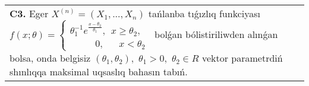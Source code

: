 \documentclass{article}
\begin{document}
\begin{tabular}{m{17cm}}
 \\
\textbf{C3.} 
Eger \(X^{(n)} = \left( X_{1},...,X_{n} \right)\) tańlanba tıǵızlıq funkciyası
$f(x;\theta) = \left\{ \begin{matrix}
\theta_{1}^{- 1}e^{\frac{x - \theta_{2}}{\theta_{1}}},\ \ x \geq \theta_{2}, \\
\ \ \ \ \ \ \ \ \ \ \ \ 0,\ \ \ \ \ \ \ x < \theta_{2}
\end{matrix} \right.\ $
bolǵan bólistiriliwden alınǵan bolsa, onda belgisiz \(\left( \theta_{1},\theta_{2} \right),\) \(\theta_{1} > 0,\) \(\theta_{2} \in R\) vektor parametrdiń shınlıqqa maksimal uqsaslıq bahasın tabıń.
 \\

\end{tabular}
\vspace{1cm}
\end{document}
